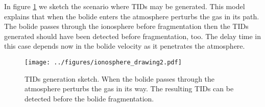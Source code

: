 In figure \ref{fig:TID-scheme-2} we sketch the scenario where TIDs may be generated. This model explains that when the bolide enters the atmosphere perturbs the gas in its path. The bolide passes through the ionosphere before fragmentation then the TIDs generated should have been detected before fragmentation, too. The delay time in this case depends now in the bolide velocity as it penetrates the atmosphere.

\begin{figure}
    \centering
    \texttt{[image: ../figures/ionosphere\_drawing2.pdf]}
       \caption{TIDs generation sketch. When the bolide passes through the atmosphere perturbs the gas in its way. The resulting TIDs can be detected before the bolide fragmentation.}
    \label{fig:TID-scheme-2}
\end{figure}